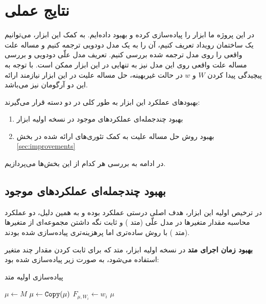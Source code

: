 \section{نتایج عملی}\label{sec:experiments}

در این پروژه ما ابزار
را پیاده‌سازی کرده و بهبود داده‌ایم.
به کمک این ابزار، می‌توانیم یک ساختمان رویداد تعریف کنیم،
آن را به یک مدل دودویی ترجمه کنیم
و مساله علت واقعی را روی مدل ترجمه شده بررسی کنیم.
تعریف مدل علّی دودویی و بررسی مساله علت واقعی 
روی این مدل نیز به تنهایی در این ابزار ممکن است.
با توجه به پیچیدگی پیدا کردن
$W$ و $w$
در حالت غیربهینه، حل مساله علیت در این ابزار
نیازمند ارائه این دو آرگومان نیز می‌باشد.

بهبودهای عملکرد این ابزار به طور کلی
در دو دسته قرار می‌گیرند:

\begin{enumerate}
  \item
    بهبود چندجمله‌ای عملکردهای موجود
    در نسخه اولیه ابزار
  \item
    بهبود روش حل مساله علیت
    به کمک تئوری‌های ارائه شده در بخش
    \ref{sec:improvements}
\end{enumerate}

در ادامه به بررسی هر کدام از این بخش‌ها می‌پردازیم.

\subsection{بهبود چندجمله‌ای عملکردهای موجود}

در ترخیص
اولیه این ابزار،
هدف اصلی درستی عملکرد بوده و به همین دلیل،
دو عملکرد محاسبه مقدار متغیرها در مدل علّی
(متد )
و ثابت نگه داشتن مجموعه‌ای از متغیرها
(متد )
با روش ساده‌تری اما پرهزینه‌تری پیاده‌سازی شده بودند.

\textbf{بهبود زمان اجرای متد
}
در نسخه اولیه ابزار، متد
که برای ثابت کردن مقدار چند متغیر استفاده می‌شود،
به صورت زیر پیاده‌سازی شده بود:

\begin{algorithm}
  \caption{پیاده‌سازی اولیه متد
  }
  \begin{latin}
  \begin{algorithmic}[1]
    \State $\mu \gets M$
      \State $\mu \gets \operatorname{\texttt{Copy}}(\mu)$
      \State $F_{\mu,W_i} \gets w_i$
    \EndFor
    \State \Return $\mu$
  \end{algorithmic}
  \end{latin}
\end{algorithm}

